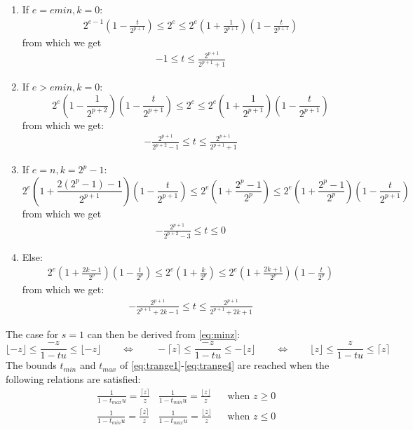 \documentclass[10pt,a4paper]{article}
\theoremstyle{plain}
\theoremstyle{definition}
\newcommand{\ceil}[1]{\lceil #1 \rceil}
\newcommand{\floor}[1]{\lfloor #1 \rfloor}
\begin{document}
\begin{enumerate}
\item If $e=emin, k=0$:
\begin{align*}
2^{e-1}\left(1-\frac{t}{2^{p+1}}\right)\leq 2^e\leq 2^e\left(1+\frac{1}{2^{p+1}}\right)\left(1-\frac{t}{2^{p+1}}\right)
\end{align*}
from which we get
\begin{align}
-1\leq t\leq\frac{2^{p+1}}{2^{p+1}+1}\label{eq:trange1}
\end{align}
\item If $e>emin, k=0$:
\[
2^e\left(1-\frac{1}{2^{p+2}}\right)\left(1-\frac{t}{2^{p+1}}\right)\leq 2^e\leq 2^e\left(1+\frac{1}{2^{p+1}}\right)\left(1-\frac{t}{2^{p+1}}\right)
\]
from which we get:
\begin{align}
-\frac{2^{p+1}}{2^{p+2}-1}\leq t\leq \frac{2^{p+1}}{2^{p+1}+1}\label{eq:trange2}
\end{align}
\item If $e=n, k=2^p-1$:
\[
2^e\left(1+\frac{2(2^p-1)-1}{2^{p+1}}\right)\left(1-\frac{t}{2^{p+1}}\right)\leq 2^e\left(1+\frac{2^p-1}{2^p}\right) \leq 2^e\left(1+\frac{2^p-1}{2^p}\right)\left(1-\frac{t}{2^{p+1}}\right)
\]
from which we get
\begin{align}
-\frac{2^{p+1}}{2^{p+2}-3}\leq t\leq 0\label{eq:trange3}
\end{align}

\item Else: 
\begin{align*}
2^e\left(1+\frac{2k-1}{2^p}\right)\left(1-\frac{t}{2^p}\right)\leq 2^e\left(1+\frac{k}{2^p}\right)\leq 2^e\left(1+\frac{2k+1}{2^p}\right)\left(1-\frac{t}{2^p}\right)
\end{align*}
from which we get:
\begin{align}
-\frac{2^{p+1}}{2^{p+1}+2k-1}\leq t\leq \frac{2^{p+1}}{2^{p+1}+2k+1}\label{eq:trange4}
\end{align}
\end{enumerate}
The case for $s=1$ can then be derived from \eqref{eq:minz}:
\[
\floor{-z}\leq \frac{-z}{1-tu}\leq \floor{-z} \qquad\Leftrightarrow\qquad -\ceil{z}\leq \frac{-z}{1-tu}\leq -\floor{z} \qquad\Leftrightarrow\qquad \floor{z}\leq \frac{z}{1-tu}\leq \ceil{z}
\]
The bounds $t_{min}$ and $t_{max}$ of \eqref{eq:trange1}-\eqref{eq:trange4} are reached when the following relations are satisfied:
\begin{align*}
&\frac{1}{1-t_{max}u}=\frac{\ceil{z}}{z} & \frac{1}{1-t_{min}u}=\frac{\floor{z}}{z} & &\text{when } z\geq 0\\
&\frac{1}{1-t_{min}u}=\frac{\ceil{z}}{z} & \frac{1}{1-t_{max}u}=\frac{\floor{z}}{z} & &\text{when } z\leq 0
\end{align*}
\end{document}
